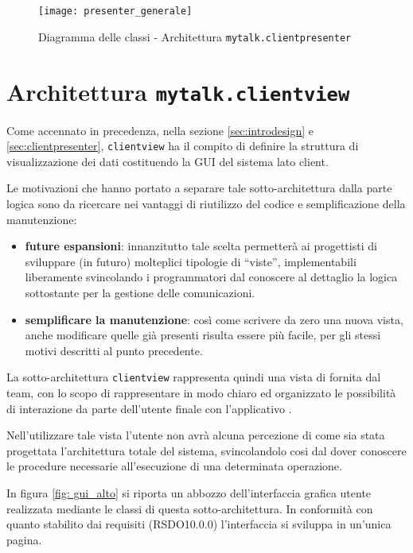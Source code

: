 \begin{figure}[H]
  \centering
  \texttt{[image: presenter\_generale]}
  \caption{Diagramma delle classi - Architettura \texttt{mytalk.clientpresenter}}\label{fig:sottoarchpresenter}
  \end{figure}
\clearpage

\section{Architettura \texttt{mytalk.clientview}}\label{sec:clientview}
Come accennato in precedenza, nella sezione \ref{sec:introdesign} e \ref{sec:clientpresenter}, \texttt{clientview} ha il compito di definire la struttura di visualizzazione dei dati costituendo la GUI del sistema lato client.

Le motivazioni che hanno portato a separare tale sotto-architettura dalla parte logica sono da ricercare nei vantaggi di riutilizzo del codice e semplificazione della manutenzione:
\begin{itemize}
 	\item \textbf{future espansioni}: innanzitutto tale scelta permetterà ai progettisti di sviluppare (in futuro) molteplici tipologie di ``viste'', implementabili liberamente svincolando i programmatori dal conoscere al dettaglio la logica sottostante per la gestione delle comunicazioni.
 	\item \textbf{semplificare la manutenzione}: così come scrivere da zero una nuova vista, anche modificare quelle già presenti risulta essere più facile, per gli stessi motivi descritti al punto precedente.
\end{itemize}

La sotto-architettura \texttt{clientview} rappresenta quindi una vista di  fornita dal team, con lo scopo di rappresentare in modo chiaro ed organizzato le possibilità di interazione da parte dell'utente finale con l'applicativo \caName.

Nell'utilizzare tale vista l'utente non avrà alcuna percezione di come sia stata progettata l'architettura totale del sistema, svincolandolo cosi dal dover conoscere le procedure necessarie all'esecuzione di una determinata operazione.

In figura \ref{fig: gui_alto} si riporta un abbozzo dell'interfaccia grafica utente realizzata mediante le classi di questa sotto-architettura. In conformità con quanto stabilito dai requisiti (RSDO10.0.0) l'interfaccia si sviluppa in un'unica pagina.

